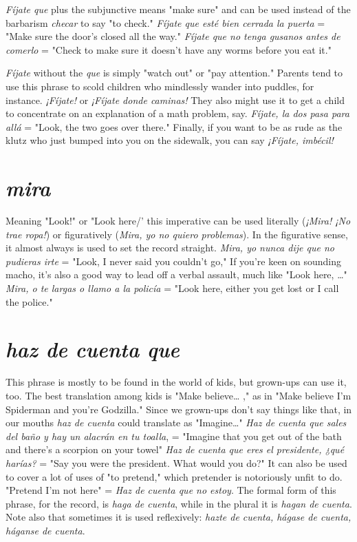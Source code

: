 \emph{Fíjate que} plus the subjunctive means "make sure" and can be
used instead of the barbarism \emph{checar} to say "to check." \emph{Fíjate que esté
bien cerrada la puerta} = "Make sure the door's closed all the way."
\emph{Fíjate que no tenga gusanos antes de comerlo} = "Check to make sure
it doesn't have any worms before you eat it."

\emph{Fíjate} without the \emph{que} is simply "watch out" or "pay attention." Parents tend to use this phrase to scold children who mindlessly
wander into puddles, for instance. \emph{¡Fíjate!} or \emph{¡Fíjate donde caminas!}
They also might use it to get a child to concentrate on an explanation
of a math problem, say. \emph{Fíjate, la dos pasa para allá} = "Look, the two
goes over there." Finally, if you want to be as rude as the klutz who
just bumped into you on the sidewalk, you can say \emph{¡Fíjate, imbécil!}

\section{\emph{mira}}

Meaning "Look!" or "Look here/' this imperative can be used
literally (\emph{¡Mira! ¡No trae ropa!}) or figuratively (\emph{Mira, yo no quiero
problemas}). In the figurative sense, it almost always is used to set the
record straight. \emph{Mira, yo nunca dije que no pudieras irte} = "Look,
I never said you couldn't go," If you're keen on sounding macho, it's
also a good way to lead off a verbal assault, much like "Look here, \ldots{}"
\emph{Mira, o te largas o llamo a la policía} = "Look here, either you get
lost or I call the police."

\section{\emph{haz de cuenta que}}

This phrase is mostly to be found in the world of kids, but
grown-ups can use it, too. The best translation among kids is "Make
believe\ldots{} ," as in "Make believe I'm Spiderman and you're Godzilla."
Since we grown-ups don't say things like that, in our mouths \emph{haz de
cuenta} could translate as "Imagine\ldots{}" \emph{Haz de cuenta que sales del
baño y hay un alacrán en tu toalla}, = "Imagine that you get out of the
bath and there's a scorpion on your towel" \emph{Haz de cuenta que eres el
presidente, ¿qué harías?} = "Say you were the president. What would
you do?" It can also be used to cover a lot of uses of "to pretend,"
which pretender is notoriously unfit to do. "Pretend I'm not here" =
\emph{Haz de cuenta que no estoy}. The formal form of this phrase, for the
record, is \emph{haga de cuenta}, while in the plural it is \emph{hagan de cuenta}.
Note also that sometimes it is used reflexively: \emph{hazte de cuenta, hágase de cuenta, háganse de cuenta}.

